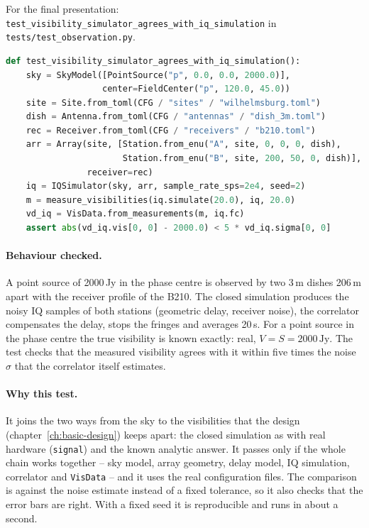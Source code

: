 For the final presentation:
\texttt{test\_visibility\_simulator\_agrees\_with\_iq\_simulation} in
\texttt{tests/test\_observation.py}.
\begin{lstlisting}[language=Python, basicstyle=\ttfamily\scriptsize, frame=single]
def test_visibility_simulator_agrees_with_iq_simulation():
    sky = SkyModel([PointSource("p", 0.0, 0.0, 2000.0)],
                   center=FieldCenter("p", 120.0, 45.0))
    site = Site.from_toml(CFG / "sites" / "wilhelmsburg.toml")
    dish = Antenna.from_toml(CFG / "antennas" / "dish_3m.toml")
    rec = Receiver.from_toml(CFG / "receivers" / "b210.toml")
    arr = Array(site, [Station.from_enu("A", site, 0, 0, 0, dish),
                       Station.from_enu("B", site, 200, 50, 0, dish)],
                receiver=rec)
    iq = IQSimulator(sky, arr, sample_rate_sps=2e4, seed=2)
    m = measure_visibilities(iq.simulate(20.0), iq, 20.0)
    vd_iq = VisData.from_measurements(m, iq.fc)
    assert abs(vd_iq.vis[0, 0] - 2000.0) < 5 * vd_iq.sigma[0, 0]
\end{lstlisting}

\paragraph*{Behaviour checked.} A point source of 2000\,Jy in the phase
centre is observed by two 3\,m dishes 206\,m apart with the receiver
profile of the B210. The closed simulation produces the noisy IQ samples
of both stations (geometric delay, receiver noise), the correlator
compensates the delay, stops the fringes and averages 20\,s. For a point
source in the phase centre the true visibility is known exactly: real,
$V = S = 2000\,\mathrm{Jy}$. The test checks that the measured
visibility agrees with it within five times the noise
$\sigma$ that the correlator itself estimates.

\paragraph*{Why this test.} It joins the two ways from the sky to the
visibilities that the design (chapter~\ref{ch:basic-design}) keeps
apart: the closed simulation as with real hardware (\texttt{signal}) and
the known analytic answer. It passes only if the whole chain works
together -- sky model, array geometry, delay model, IQ simulation,
correlator and \texttt{VisData} -- and it uses the real configuration
files. The comparison is against the noise estimate instead of a fixed
tolerance, so it also checks that the error bars are right. With a fixed
seed it is reproducible and runs in about a second.

